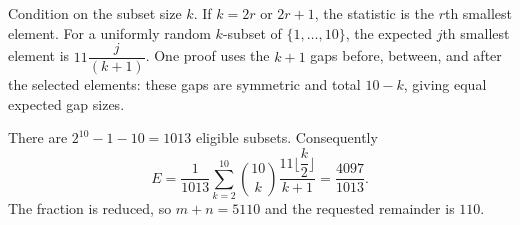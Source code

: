 Condition on the subset size $k$. If $k=2r$ or $2r+1$, the statistic is the $r$th smallest element. For a uniformly random $k$-subset of $\{1,\ldots,10\}$, the expected $j$th smallest element is $11\dfrac{j}{(k+1)}$. One proof uses the $k+1$ gaps before, between, and after the selected elements: these gaps are symmetric and total $10-k$, giving equal expected gap sizes.

There are $2^{10}-1-10=1013$ eligible subsets. Consequently
\[
E=\dfrac{1}{1013}\sum_{k=2}^{10}\binom{10}{k}\dfrac{11\lfloor \dfrac{k}{2}\rfloor}{k+1}
=\dfrac{4097}{1013}.
\]
The fraction is reduced, so $m+n=5110$ and the requested remainder is $\boxed{110}$.
